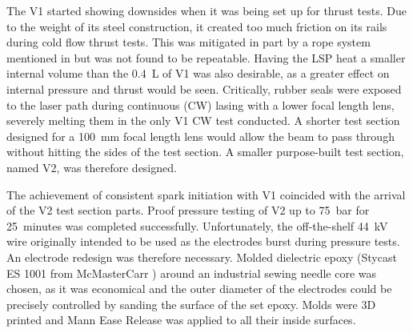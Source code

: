 The V1 started showing downsides when it was being set up for thrust tests. Due to the weight of its steel construction, it created too much friction on its rails during cold flow thrust tests. This was mitigated in part by a rope system mentioned in \textcite{duplayArgonLaserPlasmaThruster2024a} but was not found to be repeatable. Having the LSP heat a smaller internal volume than the \qty{0.4}{L} of V1 was also desirable, as a greater effect on internal pressure and thrust would be seen. Critically, rubber seals were exposed to the laser path during continuous (CW) lasing with a lower focal length lens, severely melting them in the only V1 CW test conducted. A shorter test section designed for a \qty{100}{mm} focal length lens would allow the beam to pass through without hitting the sides of the test section. A smaller purpose-built test section, named V2, was therefore designed.

The achievement of consistent spark initiation with V1 coincided with the arrival of the V2 test section parts. Proof pressure testing of V2 up to \qty{75}{bar} for \qty{25}{minutes} was completed successfully. Unfortunately, the off-the-shelf \qty{44}{kV} wire originally intended to be used as the electrodes burst during pressure tests. An electrode redesign was therefore necessary. Molded dielectric epoxy (Stycast ES 1001 from McMasterCarr \autocite{McMasterCarr}) around an industrial sewing needle core was chosen, as it was economical and the outer diameter of the electrodes could be precisely controlled by sanding the surface of the set epoxy. Molds were 3D printed and Mann Ease Release was applied to all their inside surfaces.

